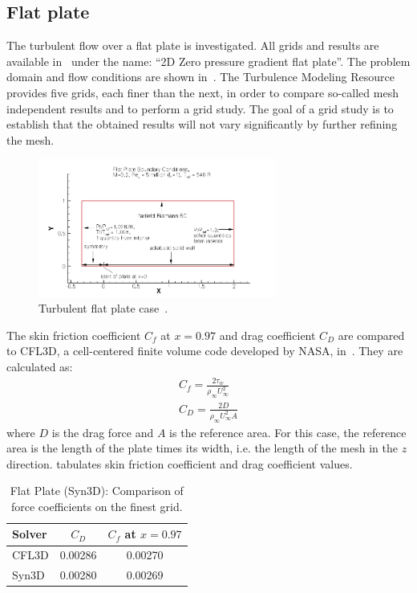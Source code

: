 \subsection{Flat plate}
The turbulent flow over a flat plate is investigated. All grids and results are available in~\cite{tmr} under the name: ``2D Zero pressure gradient flat plate''. The problem domain and flow conditions are shown in~. The Turbulence Modeling Resource provides five grids, each finer than the next, in order to compare so-called mesh independent results and to perform a grid study. The goal of a grid study is to establish that the obtained results will not vary significantly by further refining the mesh. 
\begin{figure}
    \centering
    \includegraphics[width=0.7\textwidth]{figs/flat/flatplate.png}
    \caption{Turbulent flat plate case~\cite{tmr}.}
    \label{fig:flat}
\end{figure}
The skin friction coefficient $C_f$ at $x = 0.97$ and drag coefficient $C_D$ are compared to CFL3D, a cell-centered finite volume code developed by NASA, in~. They are calculated as:
\begin{align*}
    C_f = \frac{2\tau_w}{\rho_\infty U_\infty^2}\\
    C_D = \frac{2D}{\rho_\infty U_\infty^2 A}
\end{align*}
where $D$ is the drag force and $A$ is the reference area. For this case, the reference area is the length of the plate times its width, i.e. the length of the mesh in the $z$ direction.  tabulates skin friction coefficient and drag coefficient values.
\begin{table}
\centering
\caption{Flat Plate (Syn3D): Comparison of force coefficients on the finest grid.}
\label{tab:flat}
\begin{tabular}{@{}lcc@{}}
    \toprule
    Solver & $C_D$ & $C_f$ at $x=0.97$ \\
    \midrule
    CFL3D & 0.00286 & 0.00270 \\
    Syn3D & 0.00280 & 0.00269\\
    \bottomrule
\end{tabular}
\end{table}
